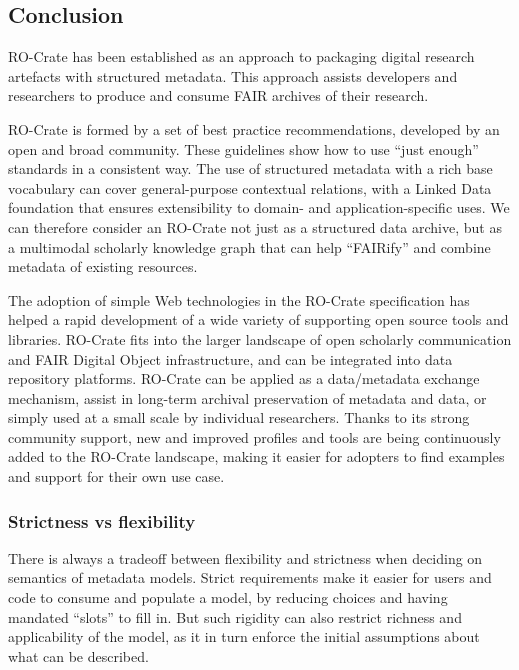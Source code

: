 \hypertarget{conclusion}{%
\subsection{Conclusion}\label{ch5:conclusion}}

RO-Crate has been established as an approach to packaging digital
research artefacts with structured metadata. This approach assists
developers and researchers to produce and consume FAIR archives of their
research.

RO-Crate is formed by a set of best practice recommendations, developed
by an open and broad community. These guidelines show how to use ``just
enough'' standards in a consistent way. The use of structured metadata
with a rich base vocabulary can cover general-purpose contextual
relations, with a Linked Data foundation that ensures extensibility to
domain- and application-specific uses. We can therefore consider an
RO-Crate not just as a structured data archive, but as a multimodal
scholarly knowledge graph that can help ``FAIRify'' and combine metadata
of existing resources.

The adoption of simple Web technologies in the RO-Crate specification
has helped a rapid development of a wide variety of supporting open
source tools and libraries. RO-Crate fits into the larger landscape of
open scholarly communication and FAIR Digital Object infrastructure, and
can be integrated into data repository platforms. RO-Crate can be
applied as a data/metadata exchange mechanism, assist in long-term
archival preservation of metadata and data, or simply used at a small
scale by individual researchers. Thanks to its strong community support,
new and improved profiles and tools are being continuously added to the
RO-Crate landscape, making it easier for adopters to find examples and
support for their own use case.

\subsubsection{Strictness vs
flexibility}\label{ch5:strictness-vs-flexibility}

There is always a tradeoff between flexibility and strictness \cite{Troncy 2010}
when deciding on semantics of metadata models. Strict requirements make
it easier for users and code to consume and populate a model, by
reducing choices and having mandated ``slots'' to fill in. But such
rigidity can also restrict richness and applicability of the model, as
it in turn enforce the initial assumptions about what can be described.

